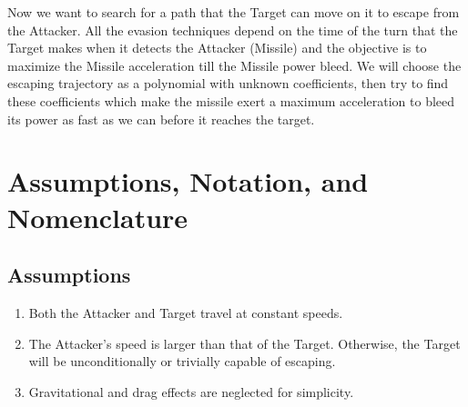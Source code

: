 	
	 
	 
	
	



Now we want to search for a path that the Target can move on it to escape from the Attacker. All the evasion techniques depend on the time of the turn that the Target makes when it detects the Attacker (Missile) and the objective is to maximize the Missile acceleration till the Missile power bleed. 
We will  choose the escaping trajectory as a polynomial with unknown coefficients, then try to find these coefficients which make the missile exert a maximum acceleration to bleed its power as fast as we can before it reaches the target.  
\section{Assumptions, Notation, and Nomenclature}
\subsection*{Assumptions}

\begin{enumerate}
	\item Both the Attacker and Target travel at constant speeds.
	\item The Attacker's speed is larger than that of the Target. Otherwise, the Target will be unconditionally or trivially capable of escaping. 
	\item Gravitational and drag effects are neglected for simplicity.
\end{enumerate}

